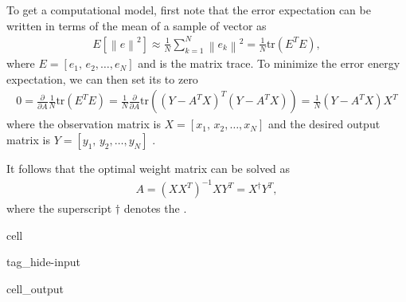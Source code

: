 \documentclass[letterpaper,10pt,english]{jupyterBook}
\begin{document}
\sphinxAtStartPar
{} To get a computational model, first note
that the error expectation can be written in terms of the mean of a
sample of vector  as
\begin{equation*}
\begin{split} E\left[\left\|e\right\|^2\right] \approx \frac1N
\sum_{k=1}^N \left\|e_k\right\|^2 = \frac1N {\mathrm{tr}}(E^T
E), \end{split}
\end{equation*}
\sphinxAtStartPar
where \( E=\left[e_1,\,e_2,\dotsc,e_N\right] \) and  is
the matrix trace. To minimize the error energy expectation, we can then
set its  to
zero
\begin{equation*}
\begin{split} 0 = \frac{\partial}{\partial A} \frac1N {\mathrm{tr}}(E^T E) =
\frac1N\frac{\partial}{\partial A} {\mathrm{tr}}((Y-A^TX)^T
(Y-A^TX)) = \frac1N(Y-A^T X)X^T \end{split}
\end{equation*}
\sphinxAtStartPar
where the observation matrix is \(
X=\left[x_1,\,x_2,\dotsc,x_N\right] \) and the desired output
matrix is \( Y=\left[y_1,\,y_2,\dotsc,y_N\right] \) . 

\sphinxAtStartPar
It follows that the optimal weight matrix  can be solved as
\begin{equation*}
\begin{split} \boxed{A = \left(XX^T\right)^{-1}XY^T = X^\dagger Y^T}, \end{split}
\end{equation*}
\sphinxAtStartPar
where the superscript \( \dagger \) denotes the .

\begin{sphinxuseclass}{cell}
\begin{sphinxuseclass}{tag_hide-input}\begin{sphinxVerbatimOutput}

\begin{sphinxuseclass}{cell_output}
\noindent{}

\end{sphinxuseclass}\end{sphinxVerbatimOutput}

\end{sphinxuseclass}
\end{sphinxuseclass}
\end{document}
